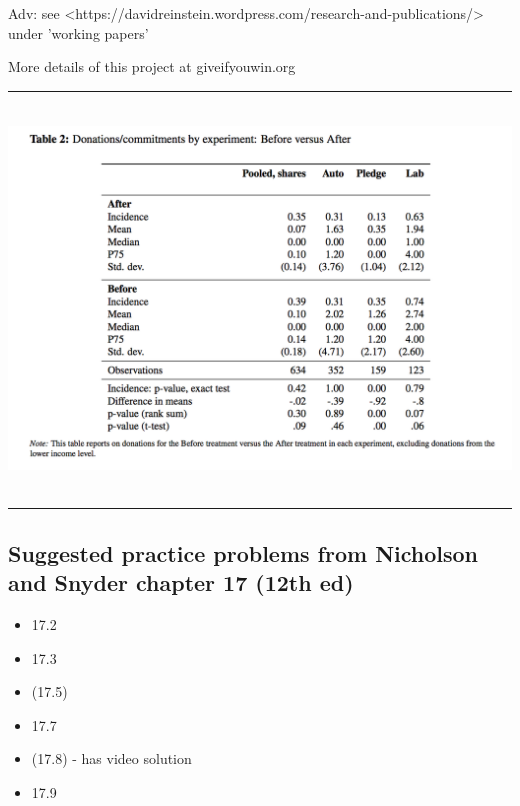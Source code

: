 \documentclass[]{article}
\providecommand{\tightlist}{%
  \setlength{\itemsep}{0pt}\setlength{\parskip}{0pt}}
\begin{document}
\textcolor{RawSienna}{Adv: see <https://davidreinstein.wordpress.com/research-and-publications/> under 'working papers'}

\bigskip

More details of this project at giveifyouwin.org

\begin{center}\rule{0.5\linewidth}{\linethickness}\end{center}

\includegraphics[height=4in]{picsfigs/beforeafer_allexp.png}

\begin{center}\rule{0.5\linewidth}{\linethickness}\end{center}

\hypertarget{suggested-practice-problems-from-nicholson-and-snyder-chapter-17-12th-ed}{%
\subsection{Suggested practice problems from Nicholson and Snyder
chapter 17 (12th
ed)}\label{suggested-practice-problems-from-nicholson-and-snyder-chapter-17-12th-ed}}

\begin{itemize}
\tightlist
\item
  17.2
\item
  17.3
\item
  (17.5)
\item
  17.7
\item
  (17.8) - has video solution
\item
  17.9
\end{itemize}
\end{document}
